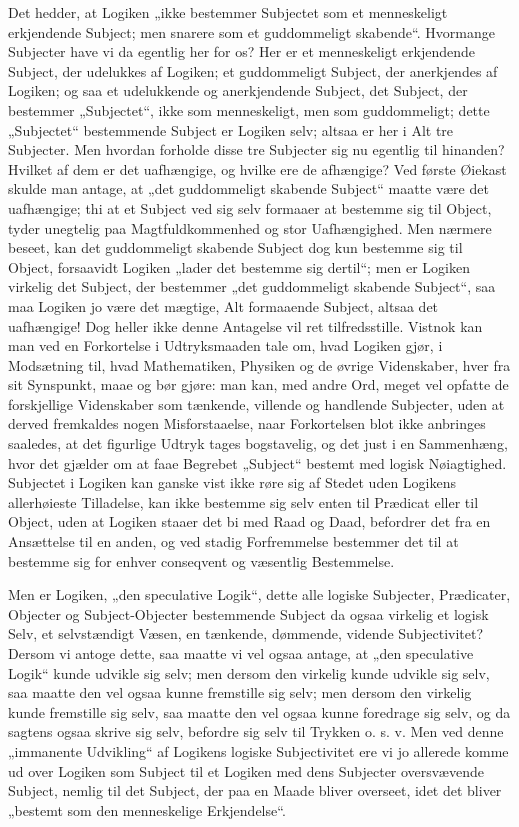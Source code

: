 \documentclass[11pt]{book}
\newcommand{\opage}[1]{\marginnote{\footnotesize\textit{[#1]}}}
\begin{document}
Det hedder, at Logiken „ikke bestemmer Subjectet som et menneskeligt
erkjendende Subject; men snarere som et guddommeligt skabende“.
Hvormange Subjecter have vi da egentlig her for os? Her er et
menneskeligt erkjendende Subject, der udelukkes af Logiken; et
guddommeligt Subject, der anerkjendes af Logiken; og saa et
udelukkende og anerkjendende Subject, det Subject, der bestemmer
„Subjectet“, ikke som menneskeligt, men som guddommeligt; dette
„Subjectet“ bestemmende Subject er Logiken selv; altsaa er her i Alt
tre Subjecter. Men hvordan forholde disse tre Subjecter sig nu
egentlig til hinanden? Hvilket af dem er det uafhængige, og hvilke
ere de afhængige? Ved første Øiekast skulde man antage, at „det
guddommeligt skabende Subject“ maatte være det uafhængige; thi at et
Subject ved sig selv formaaer at bestemme sig til Object, tyder
unegtelig paa Magtfuldkommenhed og stor Uafhængighed. Men nærmere
beseet, kan det guddommeligt skabende Subject dog kun bestemme sig
til Object,
\opage{41} \setcounter{footnote}{0}%
forsaavidt Logiken „lader det bestemme sig dertil“; men er Logiken
virkelig det Subject, der bestemmer „det guddommeligt skabende
Subject“, saa maa Logiken jo være det mægtige, Alt formaaende
Subject, altsaa det uafhængige! Dog heller ikke denne Antagelse vil
ret tilfredsstille. Vistnok kan man ved en Forkortelse i
Udtryksmaaden tale om, hvad Logiken gjør, i Modsætning til, hvad
Mathematiken, Physiken og de øvrige Videnskaber, hver fra sit
Synspunkt, maae og bør gjøre: man kan, med andre Ord, meget vel
opfatte de forskjellige Videnskaber som tænkende, villende og
handlende Subjecter, uden at derved fremkaldes nogen Misforstaaelse,
naar Forkortelsen blot ikke anbringes saaledes, at det figurlige
Udtryk tages bogstavelig, og det just i en Sammenhæng, hvor det
gjælder om at faae Begrebet „Subject“ bestemt med logisk
Nøiagtighed. Subjectet i Logiken kan ganske vist ikke røre sig af
Stedet uden Logikens allerhøieste Tilladelse, kan ikke bestemme sig
selv enten til Prædicat eller til Object, uden at Logiken staaer det
bi med Raad og Daad, befordrer det fra en Ansættelse til en anden,
og ved stadig Forfremmelse bestemmer det til at bestemme sig for
enhver conseqvent og væsentlig Bestemmelse.

Men er Logiken, „den speculative Logik“, dette alle logiske
Subjecter, Prædicater, Objecter og Subject-Objecter bestemmende
Subject da ogsaa virkelig et logisk Selv, et selvstændigt Væsen, en
tænkende, dømmende, vidende Subjectivitet? Dersom vi antoge dette,
saa maatte vi vel ogsaa antage, at „den speculative Logik“ kunde
udvikle sig selv; men dersom den virkelig kunde udvikle sig selv,
saa maatte den vel ogsaa kunne fremstille sig selv; men dersom den
virkelig kunde fremstille sig selv, saa maatte den vel ogsaa kunne
foredrage sig selv, og da sagtens ogsaa skrive sig selv, befordre
sig selv til Trykken o. s. v. Men ved denne „immanente Udvikling“
af Logikens logiske Subjectivitet ere
\opage{42} \setcounter{footnote}{0}%
vi jo allerede komme ud over Logiken som Subject til et Logiken med
dens Subjecter oversvævende Subject, nemlig til det Subject, der paa
en Maade bliver overseet, idet det bliver „bestemt som den
menneskelige Erkjendelse“.
\end{document}
